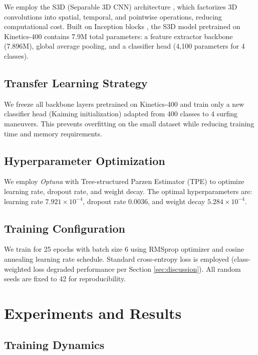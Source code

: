 \documentclass[11pt, journal]{IEEEtran}
\begin{document}
We employ the S3D (Separable 3D CNN) architecture \cite{xie2018rethinking}, which factorizes 3D convolutions into spatial, temporal, and pointwise operations, reducing computational cost. Built on Inception blocks \cite{szegedy2015going}, the S3D model pretrained on Kinetics-400 contains 7.9M total parameters: a feature extractor backbone (7.896M), global average pooling, and a classifier head (4,100 parameters for 4 classes).

\subsection{Transfer Learning Strategy}
\label{subsec:transfer_strategy}

We freeze all backbone layers pretrained on Kinetics-400 and train only a new classifier head (Kaiming initialization) adapted from 400 classes to 4 surfing maneuvers. This prevents overfitting on the small dataset while reducing training time and memory requirements.

\subsection{Hyperparameter Optimization}
\label{subsec:hyperopt}

We employ \emph{Optuna} \cite{akiba2019optuna} with Tree-structured Parzen Estimator (TPE) to optimize learning rate, dropout rate, and weight decay. The optimal hyperparameters are: learning rate $7.921 \times 10^{-4}$, dropout rate $0.0036$, and weight decay $5.284 \times 10^{-4}$.

\subsection{Training Configuration}
\label{subsec:training}

We train for 25 epochs with batch size 6 using RMSprop optimizer and cosine annealing learning rate schedule. Standard cross-entropy loss is employed (class-weighted loss degraded performance per Section \ref{sec:discussion}). All random seeds are fixed to 42 for reproducibility.

\section{Experiments and Results}
\label{sec:experiments}

\subsection{Training Dynamics}
\label{subsec:training_dynamics}
\end{document}
